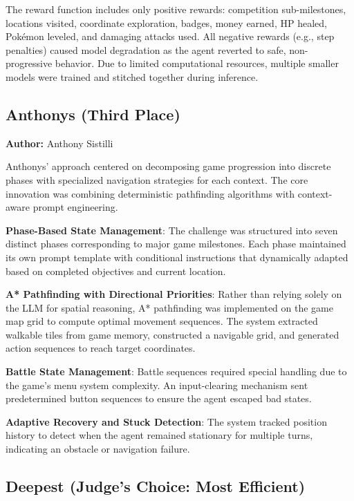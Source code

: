 The reward function includes only positive rewards: competition sub-milestones, locations visited, coordinate exploration, badges, money earned, HP healed, Pok\'{e}mon leveled, and damaging attacks used. All negative rewards (e.g., step penalties) caused model degradation as the agent reverted to safe, non-progressive behavior. Due to limited computational resources, multiple smaller models were trained and stitched together during inference.

\subsection{Anthonys (Third Place)}\label{sec:anthonys}

\textbf{Author:} Anthony Sistilli

Anthonys' approach centered on decomposing game progression into discrete phases with specialized navigation strategies for each context. The core innovation was combining deterministic pathfinding algorithms with context-aware prompt engineering.

\textbf{Phase-Based State Management}: The challenge was structured into seven distinct phases corresponding to major game milestones. Each phase maintained its own prompt template with conditional instructions that dynamically adapted based on completed objectives and current location.

\textbf{A* Pathfinding with Directional Priorities}: Rather than relying solely on the LLM for spatial reasoning, A* pathfinding was implemented on the game map grid to compute optimal movement sequences. The system extracted walkable tiles from game memory, constructed a navigable grid, and generated action sequences to reach target coordinates.

\textbf{Battle State Management}: Battle sequences required special handling due to the game's menu system complexity. An input-clearing mechanism sent predetermined button sequences to ensure the agent escaped bad states.

\textbf{Adaptive Recovery and Stuck Detection}: The system tracked position history to detect when the agent remained stationary for multiple turns, indicating an obstacle or navigation failure.

\subsection{Deepest (Judge's Choice: Most Efficient)}\label{sec:deepest}

